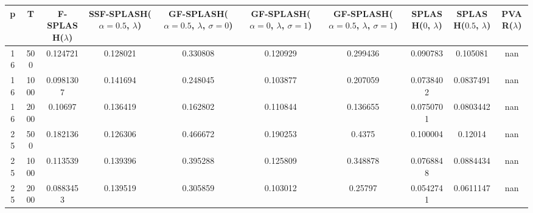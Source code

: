 \begin{tabular}{cccccccccc}
\hline
  p  &  T   &  F-SPLASH($\lambda$)  &  SSF-SPLASH($\alpha=0.5$, $\lambda$)  &  GF-SPLASH($\alpha=0.5$, $\lambda$, $\sigma=0$)  &  GF-SPLASH($\alpha=0$, $\lambda$, $\sigma=1$)  &  GF-SPLASH($\alpha=0.5$, $\lambda$, $\sigma=1$)  &  SPLASH($0$, $\lambda$)  &  SPLASH($0.5$, $\lambda$)  &  PVAR($\lambda$)  \\
\hline
 16  & 500  &       0.124721        &               0.128021                &                     0.330808                     &                    0.120929                    &                     0.299436                     &         0.090783         &          0.105081          &        nan        \\
 16  & 1000 &       0.0981307       &               0.141694                &                     0.248045                     &                    0.103877                    &                     0.207059                     &        0.0738402         &         0.0837491          &        nan        \\
 16  & 2000 &        0.10697        &               0.136419                &                     0.162802                     &                    0.110844                    &                     0.136655                     &        0.0750701         &         0.0803442          &        nan        \\
 25  & 500  &       0.182136        &               0.126306                &                     0.466672                     &                    0.190253                    &                      0.4375                      &         0.100004         &          0.12014           &        nan        \\
 25  & 1000 &       0.113539        &               0.139396                &                     0.395288                     &                    0.125809                    &                     0.348878                     &        0.0768848         &         0.0884434          &        nan        \\
 25  & 2000 &       0.0883453       &               0.139519                &                     0.305859                     &                    0.103012                    &                     0.25797                      &        0.0542741         &         0.0611147          &        nan        \\
\hline
\end{tabular}
